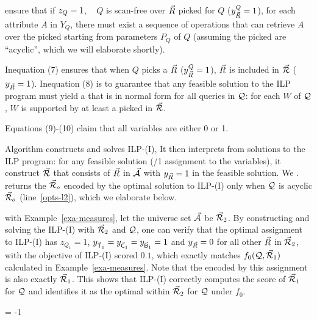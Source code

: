 \vspace{0.8ex}
 ensure that if $z_{Q}\allowbreak
=\allowbreak 1$, \ie~ $Q$ is scan-free over \bss $\vec{R}$ picked for $Q$
($y_{\vec{R}}^{Q}\allowbreak =\allowbreak 1$),  for each attribute $A$ in $Y_{Q}$,
there must exist a sequence of \get operations that can retrieve
$A$ over the picked \bss starting from parameters $P_{Q}$ of $Q$
(assuming  the picked \bss are ``acyclic'', which we will
elaborate shortly).

\vspace{0.6ex}
Inequation (7) ensures that when $Q$ picks a \bs $\vec{R}$
($y_{\vec{R}}^{Q} = 1$), $\vec{R}$ is included in \bds $\vec{{\mathcal R}}$
($y_{\vec{R}} = 1$).
%
Inequation (8) is to guarantee that any feasible solution to the
ILP program must yield a \bds that is in  normal form for all
queries in $\mathcal Q$: for each \qcs $W$ of $\mathcal Q$, $W$ is supported by
at least a \bs picked in $\vec{{\mathcal R}}$.

\vspace{0.6ex}
Equations (9)-(10) claim that all variables are either 0 or 1.


\vspace{1.6ex}
Algorithm \opts constructs and solves ILP-(I), 
%
It then interprets \bdss from solutions to the ILP
program: for any feasible solution (/1 assignment to the
variables), it construct \bds $\vec{{\mathcal R}}$ that consists of \bss
$\vec{R}$ in $\vec{{\mathcal A}}$ with $y_{\vec{R}}  = 1$ in the feasible
solution. We . \opts returns the \bds
$\vec{{\mathcal R}}_{o}$ encoded by the optimal solution to ILP-(I) only
when $\mathcal Q$ is acyclic \wrt $\vec{{\mathcal R}}_{o}$ (line~\ref{opts-l2}), which we elaborate below. 


\begin{example}\label{exa-ILP-I}
 with Example~\ref{exa-measures}, 
let the universe set $\vec{{\mathcal A}}$ be $\vec{{\mathcal R}}_{2}$.
By constructing and solving the ILP-(I) with $\vec{{\mathcal R}}_{2}$ and $\mathcal Q$,
one can verify that the optimal assignment to ILP-(I) has
$z_{Q_{1}} = 1$, $y_{\vec{\protect\mathsf{T}}_{1}} = y_{\vec{\protect\mathsf{C}}_{1}} =
y_{\vec{\protect\mathsf{B}}_{1}} = 1$ and $y_{\vec{R}} = 0$ for all other
$\vec{R}$ in $\vec{{\mathcal R}}_{2}$, with the objective of ILP-(I) scored $0.1$, which
exactly matches $f_{0}(\mathcal Q, \vec{{\mathcal R}}_{1})$ calculated in Example~\ref{exa-measures}.
Note that the encoded \bds by this assignment is also exactly
$\vec{{\mathcal R}}_{1}$. This shows that ILP-(I) correctly computes the
score of $\vec{{\mathcal R}}_{1}$ for $\mathcal Q$ and identifies it as the optimal
\bds within $\vec{{\mathcal R}}_{2}$ for $\mathcal Q$ under $f_{0}$. 
\end{example}
\looseness = -1


